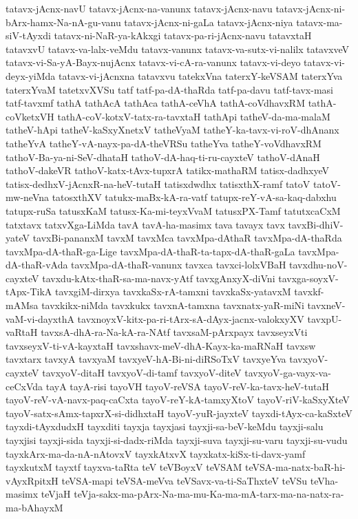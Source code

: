 {tatavx-jAcnx-navU
tatavx-jAcnx-na-vanunx
tatavx-jAcnx-navu
tatavx-jAcnx-ni-bArx-hamx-Na-nA-gu-vanu
tatavx-jAcnx-ni-gaLa
tatavx-jAcnx-niya
tatavx-ma-siV-tAyxdi
tatavx-ni-NaR-ya-kAkxgi
tatavx-pa-ri-jAcnx-navu
tatavxtaH
tatavxvU
tatavx-va-lalx-veMdu
tatavx-vanunx
tatavx-va-sutx-vi-nalilx
tatavxveV
tatavx-vi-Sa-yA-Bayx-nujAcnx
tatavx-vi-cA-ra-vanunx
tatavx-vi-deyo
tatavx-vi-deyx-yiMda
tatavx-vi-jAcnxna
tatavxvu
tatekxVna
taterxY-keVSAM
taterxYva
taterxYvaM
tatetxvXVSu
tatf
tatf-pa-dA-thaRda
tatf-pa-davu
tatf-tavx-masi
tatf-tavxmf
tathA
tathAcA
tathAca
tathA-ceVhA
tathA-coVdhavxRM
tathA-coVketxVH
tathA-coV-kotxV-tatx-ra-tavxtaH
tathApi
tatheV-da-ma-malaM
tatheV-hApi
tatheV-kaSxyXnetxV
tatheVyaM
tatheY-ka-tavx-vi-roV-dhAnanx
tatheYvA
tatheY-vA-nayx-pa-dA-theVRSu
tatheYva
tatheY-voVdhavxRM
tathoV-Ba-ya-ni-SeV-dhataH
tathoV-dA-haq-ti-ru-cayxteV
tathoV-dAnaH
tathoV-dakeVR
tathoV-katx-tAvx-tupxrA
tatikx-mathaRM
tatisx-dadhxyeV
tatisx-dedhxV-jAcnxR-na-heV-tutaH
tatisxdwdhx
tatisxthX-ramf
tatoV
tatoV-mw-neVna
tatosxthXV
tatukx-maBx-kA-ra-vatf
tatupx-reY-vA-sa-kaq-dabxhu
tatupx-ruSa
tatusxKaM
tatusx-Ka-mi-teyxVvaM
tatusxPX-Tamf
tatutxcaCxM
tatxtavx
tatxvXga-LiMda
tavA
tavA-ha-masimx
tava
tavayx
tavx
tavxBi-dhiV-yateV
tavxBi-pananxM
tavxM
tavxMca
tavxMpa-dAthaR
tavxMpa-dA-thaRda
tavxMpa-dA-thaR-ga-Lige
tavxMpa-dA-thaR-ta-tapx-dA-thaR-gaLa
tavxMpa-dA-thaR-vAda
tavxMpa-dA-thaR-vanunx
tavxca
tavxci-lolxVBaH
tavxdhu-noV-cayxteV
tavxdu-kAtx-thaR-sa-ma-navx-yAtf
tavxgAnxyX-diVni
tavxga-soyxV-tApx-TikA
tavxgiM-dirxya
tavxkaSx-rA-tamxni
tavxkaSx-yatavxM
tavxkf-mAMsa
tavxkikx-niMda
tavxkukx
tavxnA-tamxna
tavxnatx-yaR-miNi
tavxneV-vaM-vi-dayxthA
tavxnoyxV-kitx-pa-ri-tArx-sA-dAyx-jacnx-valokxyXV
tavxpU-vaRtaH
tavxsA-dhA-ra-Na-kA-ra-NAtf
tavxsaM-pArxpayx
tavxseyxVti
tavxseyxV-ti-vA-kayxtaH
tavxshavx-meV-dhA-Kayx-ka-maRNaH
tavxsw
tavxtarx
tavxyA
tavxyaM
tavxyeV-hA-Bi-ni-diRSoTxV
tavxyeYva
tavxyoV-cayxteV
tavxyoV-ditaH
tavxyoV-di-tamf
tavxyoV-diteV
tavxyoV-ga-vayx-va-ceCxVda
tayA
tayA-risi
tayoVH
tayoV-reVSA
tayoV-reV-ka-tavx-heV-tutaH
tayoV-reV-vA-navx-paq-caCxta
tayoV-reY-kA-tamxyXtoV
tayoV-riV-kaSxyXteV
tayoV-satx-sAmx-tapxrX-si-didhxtaH
tayoV-yuR-jayxteV
tayxdi-tAyx-ca-kaSxteV
tayxdi-tAyxdudxH
tayxditi
tayxja
tayxjasi
tayxji-sa-beV-keMdu
tayxji-salu
tayxjisi
tayxji-sida
tayxji-si-dadx-riMda
tayxji-suva
tayxji-su-varu
tayxji-su-vudu
tayxkArx-ma-da-nA-nAtovxV
tayxkAtxvX
tayxkatx-kiSx-ti-davx-yamf
tayxkutxM
tayxtf
tayxva-taRta
teV
teVBoyxV
teVSAM
teVSA-ma-natx-baR-hi-vAyxRpitxH
teVSA-mapi
teVSA-meVva
teVSavx-va-ti-SaThxteV
teVSu
teVha-masimx
teVjaH
teVja-sakx-ma-pArx-Na-ma-mu-Ka-ma-mA-tarx-ma-na-natx-ra-ma-bAhayxM
}
